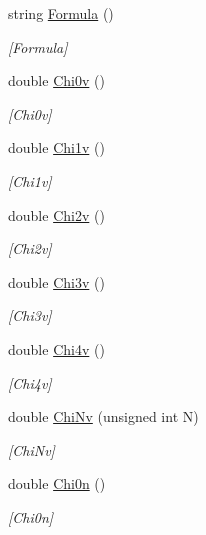 \begin{DoxyCompactItemize}
string \mbox{\hyperlink{class_molecule_a2a8be2c496fe515635ad70949ca3c634}{Formula}} ()
\begin{DoxyCompactList}\small\item\em \mbox{[}Formula\mbox{]} \end{DoxyCompactList}\item 
double \mbox{\hyperlink{class_molecule_a7299912c0000b8f3520984400f72a86b}{Chi0v}} ()
\begin{DoxyCompactList}\small\item\em \mbox{[}Chi0v\mbox{]} \end{DoxyCompactList}\item 
double \mbox{\hyperlink{class_molecule_a867c7ad16812f1aafac38087eec756f4}{Chi1v}} ()
\begin{DoxyCompactList}\small\item\em \mbox{[}Chi1v\mbox{]} \end{DoxyCompactList}\item 
double \mbox{\hyperlink{class_molecule_a31a72034aa6769237eb794d923788584}{Chi2v}} ()
\begin{DoxyCompactList}\small\item\em \mbox{[}Chi2v\mbox{]} \end{DoxyCompactList}\item 
double \mbox{\hyperlink{class_molecule_ac708655c8a81d9e25fe414f43b1d0b1c}{Chi3v}} ()
\begin{DoxyCompactList}\small\item\em \mbox{[}Chi3v\mbox{]} \end{DoxyCompactList}\item 
double \mbox{\hyperlink{class_molecule_a26ca2dbe4464eee3cf0405c1a09fb310}{Chi4v}} ()
\begin{DoxyCompactList}\small\item\em \mbox{[}Chi4v\mbox{]} \end{DoxyCompactList}\item 
double \mbox{\hyperlink{class_molecule_ada6fd7f4b47622e5a07d80052cf0d0b5}{Chi\+Nv}} (unsigned int N)
\begin{DoxyCompactList}\small\item\em \mbox{[}Chi\+Nv\mbox{]} \end{DoxyCompactList}\item 
double \mbox{\hyperlink{class_molecule_aaf96784d73e8e2052d3e78bd4a198810}{Chi0n}} ()
\begin{DoxyCompactList}\small\item\em \mbox{[}Chi0n\mbox{]} \end{DoxyCompactList}\item 

\end{DoxyCompactItemize}
